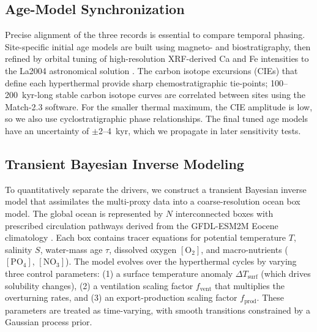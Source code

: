 \documentclass{article}
\begin{document}
\subsection{Age-Model Synchronization}
Precise alignment of the three records is essential to compare temporal phasing. Site-specific initial age models are built using magneto- and biostratigraphy, then refined by orbital tuning of high-resolution XRF-derived Ca and Fe intensities to the La2004 astronomical solution \cite{Westerhold2020}. The carbon isotope excursions (CIEs) that define each hyperthermal provide sharp chemostratigraphic tie-points; 100--200~kyr-long stable carbon isotope curves are correlated between sites using the Match-2.3 software. For the smaller thermal maximum, the CIE amplitude is low, so we also use cyclostratigraphic phase relationships. The final tuned age models have an uncertainty of $\pm$2--4~kyr, which we propagate in later sensitivity tests.

\subsection{Transient Bayesian Inverse Modeling}
To quantitatively separate the drivers, we construct a transient Bayesian inverse model that assimilates the multi-proxy data into a coarse-resolution ocean box model. The global ocean is represented by $N$ interconnected boxes with prescribed circulation pathways derived from the GFDL-ESM2M Eocene climatology \cite{Dunne2012}. Each box contains tracer equations for potential temperature $T$, salinity $S$, water-mass age $\tau$, dissolved oxygen $[{\mathrm{O}_2}]$, and macro-nutrients ($[\mathrm{PO}_4]$, $[\mathrm{NO}_3]$). The model evolves over the hyperthermal cycles by varying three control parameters: (1) a surface temperature anomaly $\Delta T_{\mathrm{surf}}$ (which drives solubility changes), (2) a ventilation scaling factor $f_{\mathrm{vent}}$ that multiplies the overturning rates, and (3) an export-production scaling factor $f_{\mathrm{prod}}$. These parameters are treated as time-varying, with smooth transitions constrained by a Gaussian process prior.
\end{document}
